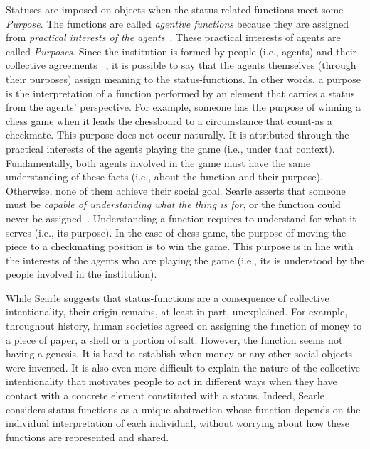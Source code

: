 \documentclass[runningheads]{llncs}
\begin{document}
Statuses are imposed on objects when the status-related functions meet some \emph{Purpose}.
The functions are called \emph{agentive functions} because they are assigned from \textit{practical interests of the agents}~\cite[p.20]{searle1995construction}. These practical interests of agents are called \emph{Purposes}. Since the institution is formed by people (i.e., agents) and their collective agreements ~\cite{searle1995construction}, it is possible to say that the agents themselves (through their purposes) assign meaning to the status-functions.
In other words, a purpose is the interpretation of a function performed by an element that carries a status from the agents' perspective.
For example, someone has the purpose of winning a chess game when it leads the chessboard to a circumstance that count-as a checkmate.
This purpose does not occur naturally. It is attributed through the practical interests of the agents playing the game (i.e., under that context). Fundamentally, both agents involved in the game must have the same understanding of these facts (i.e., about the function and their purpose). Otherwise, none of them achieve their social goal.
Searle asserts that someone must be \textit{capable of understanding what the thing is for}, or the function could never be assigned~\cite[p.22]{searle1995construction}. Understanding a function requires to understand for what it serves (i.e., its purpose). In the case of chess game, %
the purpose of moving the piece to a checkmating position is to win the game. This purpose is in line with the interests of the agents who are playing the game (i.e., its is understood by the people involved in the institution).


While Searle suggests that status-functions are a consequence of collective intentionality, their origin remains, at least in part, unexplained.
For example, throughout history, human societies agreed on assigning the function of money to a piece of paper, a shell or a portion of salt.
However, the function seems not having a genesis. 
It is hard to establish when money or any other social objects were invented.
It is also even more difficult to explain the nature of the collective intentionality that motivates people to act in different ways when they have contact with a concrete element constituted with a status. 
Indeed, Searle considers status-functions as a unique abstraction whose function depends on the individual interpretation of each individual, without worrying about how these functions are represented and shared.
\end{document}
